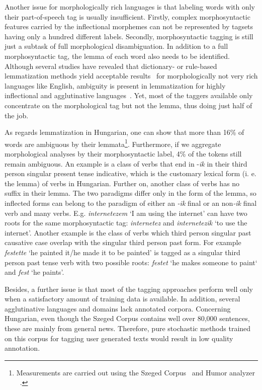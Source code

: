 Another issue for morphologically rich languages is that labeling words with only their part-of-speech tag is usually insufficient. 
Firstly, complex morphosyntactic features carried by the inflectional morphemes can not be represented by tagsets having only a hundred different labels. 
Secondly, morphosyntactic tagging is still just a subtask of full morphological disambiguation. 
In addition to a full morphosyntactic tag, the lemma of each word also needs to be identified. Although several studies have revealed that dictionary- or rule-based lemmatization methods yield acceptable results~\cite{Porter1980,Plisson2004} for morphologically not very rich languages like English, ambiguity is present in lemmatization for highly inflectional and agglutinative languages~\cite{Jursic2007,Sak2007,Chrupaa2008}. 
Yet, most of the taggers available only concentrate on the morphological tag but not the lemma, thus doing just half of the job.

As regards lemmatization in Hungarian, %
one can show that more than 16\% of words are ambiguous by their lemmata\footnote{Measurements are carried out using the  Szeged Corpus~\cite{Csendes2004} and Humor analyzer ~\cite{Proszeky1994,Novak2003}.}. 
Furthermore, if we aggregate morphological analyses by their morphosyntactic label, 4\% of the tokens still remain ambiguous. 
An example is a class of verbs that end in -\emph{ik} in their third person singular present tense indicative, which is the customary lexical form (i. e. the lemma) of verbs in Hungarian. Further on, another class of verbs has no suffix in their lemma. 
The two paradigms differ only in the form of the lemma, so inflected forms can belong to the paradigm of either an \emph{-ik} final or an non\emph{-ik} final verb and many verbs. 
E.g. \emph{internetezem} `I am using the internet' can have two roots for the same morphosyntactic tag: \emph{internetez} and \emph{internetezik} `to use the internet'.
Another example is the class of verbs which third person singular past causative case overlap with the singular third person past form. 
For example \emph{festette} `he painted it/he made it to be painted' is tagged as a singular third person past tense verb with two possible roots: \emph{festet} `he makes someone to paint` and \emph{fest} `he paints'.  

Besides, a further issue is that most of the tagging approaches perform well only when a satisfactory amount of training data is available. 
In addition, several agglutinative languages and domains lack annotated corpora. 
Concerning Hungarian, even though the Szeged Corpus contains well over 80,000 sentences, these are mainly from general news. 
Therefore, pure stochastic methods trained on this corpus for tagging user generated texts would result in low quality annotation. 

